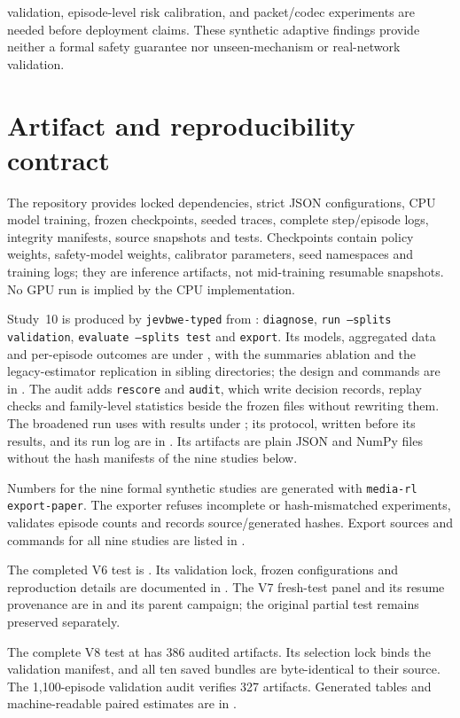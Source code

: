 \documentclass[10pt]{article}
\begin{document}
validation, episode-level risk calibration, and packet/codec experiments are needed before deployment claims. These synthetic adaptive findings provide neither a formal safety guarantee nor unseen-mechanism or real-network validation.

\appendix
\section{Artifact and reproducibility contract}
The repository provides locked dependencies, strict JSON configurations, CPU model training, frozen checkpoints, seeded traces, complete step/episode logs, integrity manifests, source snapshots and tests. Checkpoints contain policy weights, safety-model weights, calibrator parameters, seed namespaces and training logs; they are inference artifacts, not mid-training resumable snapshots. No GPU run is implied by the CPU implementation.

Study~10 is produced by \texttt{jevbwe-typed} from : \texttt{diagnose}, \texttt{run --splits validation}, \texttt{evaluate --splits test} and \texttt{export}. Its models, aggregated data and per-episode outcomes are under , with the summaries ablation and the legacy-estimator replication in sibling directories; the design and commands are in . The audit adds \texttt{rescore} and \texttt{audit}, which write decision records, replay checks and family-level statistics beside the frozen files without rewriting them. The broadened run uses  with results under ; its protocol, written before its results, and its run log are in . Its artifacts are plain JSON and NumPy files without the hash manifests of the nine studies below.

Numbers for the nine formal synthetic studies are generated with \texttt{media-rl export-paper}. The exporter refuses incomplete or hash-mismatched experiments, validates episode counts and records source/generated hashes. Export sources and commands for all nine studies are listed in .

The completed V6 test is . Its validation lock, frozen configurations and reproduction details are documented in . The V7 fresh-test panel and its resume provenance are in  and its parent campaign; the original partial test remains preserved separately. \par
The complete V8 test at  has 386 audited artifacts. Its selection lock binds the validation manifest, and all ten saved bundles are byte-identical to their source. The 1,100-episode validation audit verifies 327 artifacts. Generated tables and machine-readable paired estimates are in .
\end{document}
